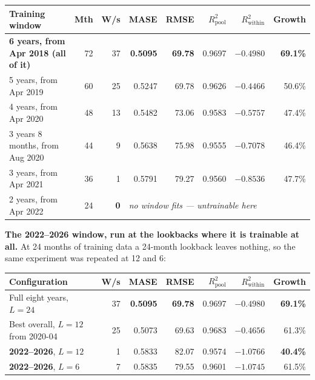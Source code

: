 \documentclass[11pt,a4paper]{article}
\begin{document}
\begin{center}
\footnotesize
\begin{tabular}{@{}lrrrrrrr@{}}
\toprule
\textbf{Training window} & \textbf{Mth} & \textbf{W/s} & \textbf{MASE} & \textbf{RMSE} & \textbf{$R^2_{\text{pool}}$} & \textbf{$R^2_{\text{within}}$} & \textbf{Growth} \\
\midrule
\textbf{6 years, from Apr 2018 (all of it)} & 72 & 37 & \textbf{0.5095} & \textbf{69.78} & 0.9697 & $-0.4980$ & \textbf{69.1\%} \\
5 years, from Apr 2019 & 60 & 25 & 0.5247 & 69.78 & 0.9626 & $-0.4466$ & 50.6\% \\
4 years, from Apr 2020 & 48 & 13 & 0.5482 & 73.06 & 0.9583 & $-0.5757$ & 47.4\% \\
3 years 8 months, from Aug 2020 & 44 & 9 & 0.5638 & 75.98 & 0.9555 & $-0.7078$ & 46.4\% \\
3 years, from Apr 2021 & 36 & 1 & 0.5791 & 79.27 & 0.9560 & $-0.8536$ & 47.7\% \\
2 years, from Apr 2022 & 24 & \textbf{0} & \multicolumn{5}{l}{\textit{no window fits --- untrainable here}} \\
\bottomrule
\end{tabular}
\end{center}

\textbf{The 2022--2026 window, run at the lookbacks where it is trainable at all.} At 24 months of
training data a 24-month lookback leaves nothing, so the same experiment was repeated at 12 and 6:

\begin{center}
\scriptsize
\begin{tabular}{@{}lrrrrrr@{}}
\toprule
\textbf{Configuration} & \textbf{W/s} & \textbf{MASE} & \textbf{RMSE} & \textbf{$R^2_{\text{pool}}$} & \textbf{$R^2_{\text{within}}$} & \textbf{Growth} \\
\midrule
Full eight years, $L=24$ & 37 & \textbf{0.5095} & \textbf{69.78} & 0.9697 & $\mathbf{-0.4980}$ & \textbf{69.1\%} \\
Best overall, $L=12$ from 2020-04 & 25 & 0.5073 & 69.63 & 0.9683 & $-0.4656$ & 61.3\% \\
\midrule
\textbf{2022--2026}, $L=12$ & 1 & 0.5833 & 82.07 & 0.9574 & $-1.0766$ & \textbf{40.4\%} \\
\textbf{2022--2026}, $L=6$ & 7 & 0.5835 & 79.55 & 0.9601 & $-1.0745$ & 61.5\% \\
\bottomrule
\end{tabular}
\end{center}
\end{document}
